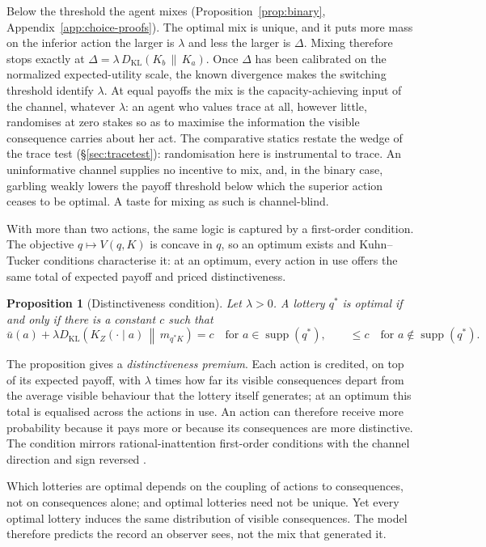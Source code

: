 \documentclass[11pt,a4paper]{article}
\newtheorem{proposition}[theorem]{Proposition}
\theoremstyle{definition}
\newcommand{\supp}{\operatorname{supp}}
\newcommand{\KL}{D_{\mathrm{KL}}}
\newcommand{\1}{\mathbf 1}
\begin{document}
Below the threshold the agent mixes (Proposition~\ref{prop:binary}, Appendix~\ref{app:choice-proofs}).  The
optimal mix is unique, and it puts more mass on the inferior action the larger is $\lambda$ and less the larger
is $\Delta$.  Mixing therefore stops exactly at $\Delta=\lambda\,\KL(K_b\,\|\,K_a)$.  Once $\Delta$ has been
calibrated on the normalized expected-utility scale, the known divergence makes the switching threshold
identify $\lambda$.  At equal payoffs the
mix is the capacity-achieving input of the channel, whatever $\lambda$: an agent who values trace at all,
however little, randomises at zero stakes so as to maximise the information the visible consequence carries
about her act.  The comparative statics restate the wedge of the trace test (\S\ref{sec:tracetest}):
randomisation here is instrumental to trace.  An uninformative channel supplies no incentive to mix, and, in
the binary case, garbling weakly lowers the payoff threshold below which the superior action ceases to be
optimal.  A taste for mixing as such is channel-blind.

With more than two actions, the same logic is captured by a first-order condition.  The objective
$q\mapsto V(q,K)$ is concave in $q$, so an optimum exists and Kuhn--Tucker conditions characterise it: at an
optimum, every action in use offers the same total of expected payoff and priced distinctiveness.

\begin{proposition}[Distinctiveness condition]\label{prop:optimal-choice}
Let $\lambda>0$.  A lottery $q^*$ is optimal if and only if there is a constant $c$ such that
\[
 \bar u(a)+\lambda\KL\!\left(K_Z(\cdot\mid a)\,\middle\|\,m_{q^*K}\right)=c
 \quad\text{for }a\in\supp(q^*),
 \qquad
 \le c\quad\text{for }a\notin\supp(q^*).
\]
\end{proposition}

The proposition gives a \emph{distinctiveness premium}.  Each action is credited, on top of its expected payoff,
with $\lambda$ times how far its visible consequences depart from the average visible behaviour that the lottery
itself generates; at an optimum this total is equalised across the actions in use.  An action can therefore receive
more probability because it pays more or because its consequences are more distinctive.  The
condition mirrors rational-inattention first-order conditions with the channel direction and sign reversed
\cite{Sims2003,MatejkaMcKay2015}.

Which lotteries are optimal depends on the coupling of actions to consequences, not on consequences alone; and
optimal lotteries need not be unique.  Yet every optimal lottery induces the same distribution of visible
consequences.  The model therefore predicts the record an observer sees, not the mix that generated it.
\end{document}
